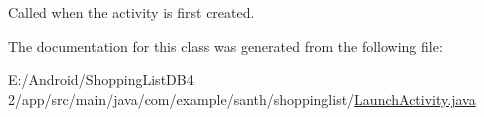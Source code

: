 Called when the activity is first created. 



The documentation for this class was generated from the following file\+:\begin{DoxyCompactItemize}
\item 
E\+:/\+Android/\+Shopping\+List\+D\+B4 2/app/src/main/java/com/example/santh/shoppinglist/\hyperlink{_launch_activity_8java}{Launch\+Activity.\+java}\end{DoxyCompactItemize}
